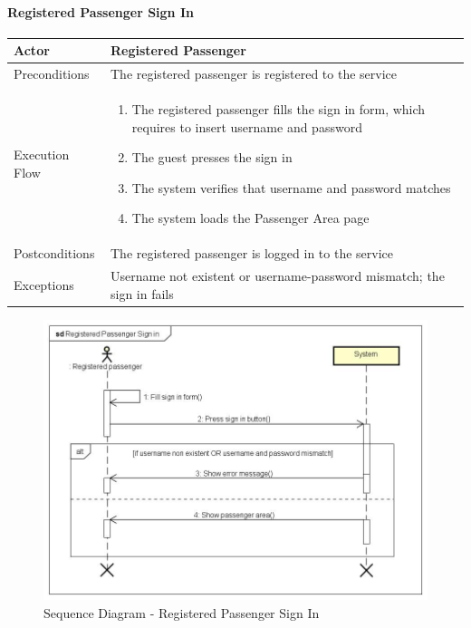 \paragraph{Registered Passenger Sign In}
\begin{center}
	\begin{tabular}{ | l | p{8cm} |}
		\hline
		Actor &  Registered Passenger	\\ \hline
		Preconditions & The registered passenger is registered to the service	\\ \hline
		Execution Flow & \begin{enumerate}
			\item The registered passenger fills the sign in form, which requires to insert username and password
			\item The guest presses the sign in
			\item The system verifies that username and password matches
			\item The system loads the Passenger Area page
		\end{enumerate}		\\ \hline
		Postconditions & The registered passenger is logged in to the service	\\ \hline
		Exceptions & Username not existent or username-password mismatch; the sign in fails \\ \hline
	\end{tabular}
\end{center}
\newpage
\begin{landscape}
\begin{figure}[!h]
	\begin{center}			
		\includegraphics[height=\textheight]{../SE2_SD/RegisteredPassengerSignIn}
		\caption{Sequence Diagram - Registered Passenger Sign In}	
	\end{center}
\end{figure}
\end{landscape}
\newpage
